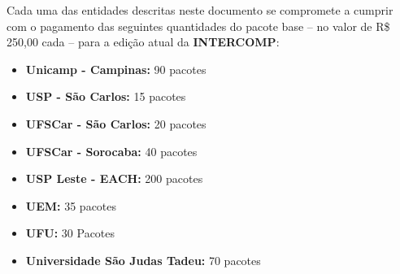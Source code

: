 \begin{article}
	\label{art:cotas}
	Cada uma das entidades descritas neste documento se compromete a cumprir com o pagamento das seguintes quantidades do pacote base -- no valor de R\$ 250,00 cada -- para a edição atual da \textbf{INTERCOMP}:
	\begin{itemize}[noitemsep]
		\item \textbf{Unicamp - Campinas:} 90 pacotes
		\item \textbf{USP - São Carlos:} 15 pacotes
		\item \textbf{UFSCar - São Carlos:} 20 pacotes
		\item \textbf{UFSCar - Sorocaba:} 40 pacotes
		\item \textbf{USP Leste - EACH:} 200 pacotes
		\item \textbf{UEM:} 35 pacotes
		\item \textbf{UFU:} 30 Pacotes
		\item \textbf{Universidade São Judas Tadeu:} 70 pacotes
	\end{itemize}
\end{article}
